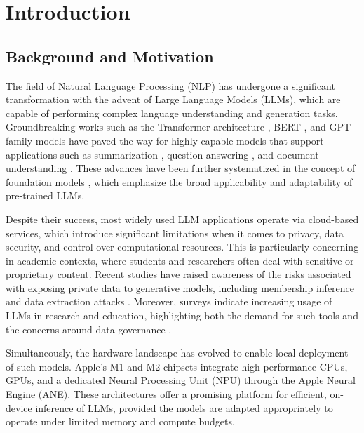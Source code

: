 
\chapter {Introduction}
\label{ch:Introduction}

\section{Background and Motivation}
\label{sec:BackgroundAndMotivation}

The field of Natural Language Processing (NLP) has undergone a significant transformation with the advent of Large Language Models (LLMs), which are capable of performing complex language understanding and generation tasks. Groundbreaking works such as the Transformer architecture \cite{vaswani2017attention}, BERT \cite{devlin2018bert}, and GPT-family models \cite{brown2020language, openai2023gpt4} have paved the way for highly capable models that support applications such as summarization \cite{liu2019text}, question answering \cite{izacard2021leveraging}, and document understanding \cite{beltagy2020longformer}. These advances have been further systematized in the concept of foundation models \cite{bommasani2021opportunities}, which emphasize the broad applicability and adaptability of pre-trained LLMs.

Despite their success, most widely used LLM applications operate via cloud-based services, which introduce significant limitations when it comes to privacy, data security, and control over computational resources. This is particularly concerning in academic contexts, where students and researchers often deal with sensitive or proprietary content. Recent studies have raised awareness of the risks associated with exposing private data to generative models, including membership inference \cite{mattern2023membership} and data extraction attacks \cite{nasr2023extraction}. Moreover, surveys indicate increasing usage of LLMs in research and education, highlighting both the demand for such tools and the concerns around data governance \cite{deschenes2024survey, hosseini2023chatgpt}.

Simultaneously, the hardware landscape has evolved to enable local deployment of such models. Apple's M1 and M2 chipsets integrate high-performance CPUs, GPUs, and a dedicated Neural Processing Unit (NPU) through the Apple Neural Engine (ANE). These architectures offer a promising platform for efficient, on-device inference of LLMs, provided the models are adapted appropriately to operate under limited memory and compute budgets.

